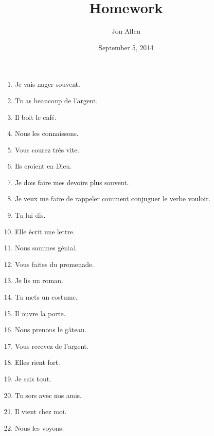 \documentclass[letterpaper]{article}
\begin{document}
\title{Homework}
\date{September 5, 2014}
\author{Jon Allen}
\maketitle
\begin{enumerate}
\item
Je vais nager souvent.
\item
Tu as beaucoup de l'argent.
\item
Il boit le café.
\item
Nous les connaissons.
\item
Vous courez très vite.
\item
Ils croient en Dieu.
\item
Je dois faire mes devoirs plus souvent.
\item
Je veux me faire de rappeler comment conjuguer le verbe vouloir.
\item
Tu lui dis.
\item
Elle écrit une lettre.
\item
Nous sommes gènial.
\item
Vous faites du promenade.
\item
Je lis un roman.
\item
Tu mets un costume.
\item
Il ouvre la porte.
\item
Nous prenons le gâteau.
\item
Vous recevez de l'argent.
\item
Elles rient fort.
\item
Je sais tout.
\item
Tu sors avec nos amis.
\item
Il vient chez moi.
\item
Nous les voyons.
\end{enumerate}
\end{document}
